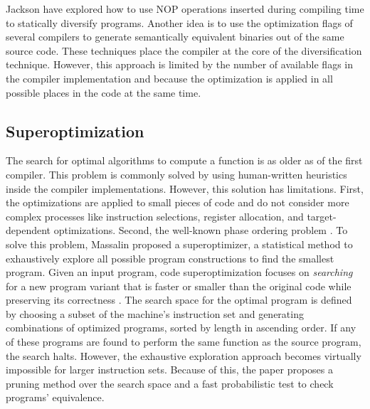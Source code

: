 Jackson \etal \cite{jackson} have explored how to use NOP operations inserted during compiling time to statically diversify programs. Another idea  is to use the optimization flags of several compilers to generate semantically equivalent binaries out of the same source code. These techniques place the compiler at the core of the diversification technique. However, this approach is limited by the number of available flags in the compiler implementation and because the optimization is applied in all possible places in the code at the same time.


\subsection*{Superoptimization}

The search for optimal algorithms to compute a function is as older as of the first compiler. This problem is commonly solved by using human-written heuristics inside the compiler implementations. However, this solution has limitations. First, the optimizations are applied to small pieces of code and do not consider more complex processes like instruction selections, register allocation, and target-dependent optimizations. Second, the well-known phase ordering problem \cite{phase-ordering-problem}. To solve this problem, Massalin \etal \cite{Massalin1987} proposed a superoptimizer, a statistical method to exhaustively explore all possible program constructions to find the smallest program.
Given an input program, code superoptimization focuses on \emph{searching} for a new program variant that is faster or smaller than the original code while preserving its correctness \cite{bunel_learning_2017}.
The search space for the optimal program is defined by choosing a subset of the machine's instruction set and generating combinations of optimized programs, sorted by length in ascending order. If any of these programs are found to perform the same function as the source program, the search halts. However, the exhaustive exploration approach becomes virtually impossible for larger instruction sets.
Because of this, the paper proposes a pruning method over the search space and a fast probabilistic test to check programs' equivalence.

